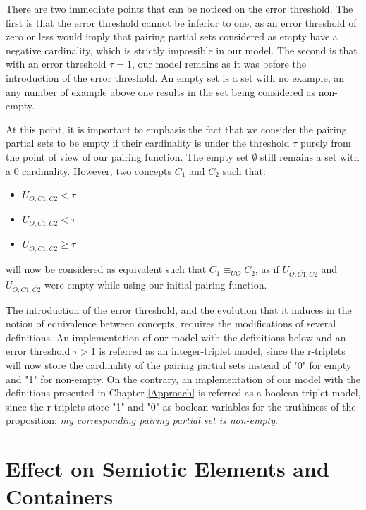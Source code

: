 There are two immediate points that can be noticed on the error threshold. The first is that the error threshold cannot be inferior to one, as an error threshold of zero or less would imply that pairing partial sets considered as empty have a negative cardinality, which is strictly impossible in our model. The second is that with an error threshold $\tau = 1$, our model remains as it was before the introduction of the error threshold. An empty set is a set with no example, an any number of example above one results in the set being considered as non-empty.

At this point, it is important to emphasis the fact that we consider the pairing partial sets to be empty if their cardinality is under the threshold $\tau$ purely from the point of view of our pairing function. The empty set $\emptyset$ still remains a set with a 0 cardinality. However, two concepts $C_{1}$ and $C_{2}$ such that:

\begin{itemize}
    \item $U_{O,C1,C2} < \tau$
    \item $U_{O,\overbar{C1},C2} < \tau$
    \item $U_{O,C1,\overbar{C2}} \geq \tau$
\end{itemize}

will now be considered as equivalent such that $C_{1} \equiv_{UO} C_{2}$, as if $U_{O,\overbar{C1},C2}$ and $U_{O,C1,\overbar{C2}}$ were empty while using our initial pairing function.

The introduction of the error threshold, and the evolution that it induces in the notion of equivalence between concepts, requires the modifications of several definitions. An implementation of our model with the definitions below and an error threshold $\tau > 1$ is referred as an integer-triplet model, since the r-triplets will now store the cardinality of the pairing partial sets instead of "0" for empty and "1" for non-empty. On the contrary, an implementation of our model with the definitions presented in Chapter \ref{Approach} is referred as a boolean-triplet model, since the r-triplets store "1" and "0" as boolean variables for the truthiness of the proposition: \emph{my corresponding pairing partial set is non-empty}.

\section{Effect on Semiotic Elements and Containers}
\label{sec:DoGEffectCon}

